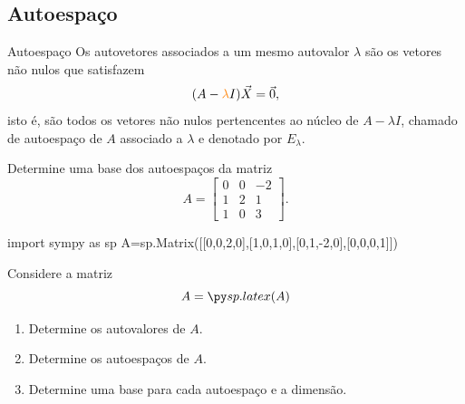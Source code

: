 \subsection*{Autoespaço}
\begin{frame}[label=autovalores]{Autoespaço}
Os autovetores associados a um mesmo autovalor {\color{orange}$\lambda$} são os vetores não nulos  que satisfazem
\[(A-{\color{orange}\lambda}  I)\vec{X}=\vec{0},\]
isto é, {\color{red}são todos os vetores não nulos} pertencentes ao {\color{red}núcleo de $A-\lambda I$}, chamado de {\color{blue}autoespaço de $A$ associado a $\lambda$} e denotado por $E_{\lambda}$. 


\begin{exe}
Determine uma base dos autoespaços da  matriz 
\[A=\begin{bmatrix}
0 & 0 & -2\\ 1 & 2 & 1 \\ 1 &0& 3
\end{bmatrix}. \]
\end{exe}
\end{frame}

\begin{frame}[label=autovalores,fragile=singleslide]{}
\begin{casa}
\begin{pycode}
import sympy as sp
A=sp.Matrix([[0,0,2,0],[1,0,1,0],[0,1,-2,0],[0,0,0,1]])
\end{pycode}
Considere a matriz
\[A=
\pyl{A}
\]
\begin{enumerate}
\item Determine os autovalores de $A$.
\item  Determine os autoespaços de $A$.
\item  Determine uma base para cada autoespaço e a dimensão.
\end{enumerate}
\end{casa}
\end{frame}



